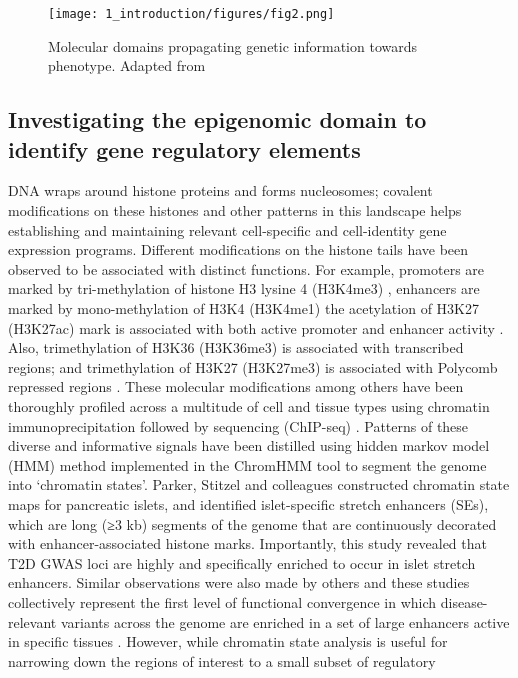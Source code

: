 \begin{figure}
        \centering
        \texttt{[image: 1\_introduction/figures/fig2.png]}
        \caption{Molecular domains propagating genetic information towards phenotype. Adapted from \cite{civelekSystemsGeneticsApproaches2014}}
        \label{fig:ci_f2}
\end{figure}


\subsection{Investigating the epigenomic domain to identify gene regulatory elements}
DNA wraps around histone proteins and forms nucleosomes; covalent modifications on these histones and other patterns in this landscape helps establishing and maintaining relevant cell-specific and cell-identity gene expression programs. Different modifications on the histone tails have been observed to be associated with distinct functions. For example, promoters are marked by tri-methylation of histone H3 lysine 4 (H3K4me3) \cite{bernsteinBivalentChromatinStructure2006, mikkelsenGenomewideMapsChromatin2007,adliGenomewideChromatinMaps2010}, enhancers are marked by mono-methylation of H3K4 (H3K4me1) \cite{heintzmanDistinctPredictiveChromatin2007} the acetylation of H3K27 (H3K27ac) mark is associated with both active promoter and enhancer activity \cite{mikkelsenGenomewideMapsChromatin2007}. Also, trimethylation of H3K36 (H3K36me3) is associated with transcribed regions; and trimethylation of H3K27 (H3K27me3) is associated with Polycomb repressed regions \cite{heintzmanDistinctPredictiveChromatin2007, zhouChartingHistoneModifications2011}. These molecular modifications among others have been thoroughly profiled across a multitude of cell and tissue types using chromatin immunoprecipitation followed by sequencing (ChIP-seq) \cite{theencodeprojectconsortiumIntegratedEncyclopediaDNA2012, consortiumIntegrativeAnalysis1112015}. Patterns of these diverse and informative signals have been distilled using hidden markov model (HMM) method implemented in the ChromHMM tool \cite{ernstMappingAnalysisChromatin2011, ernstChromHMMAutomatingChromatin2012} to segment the genome into ‘chromatin states’. Parker, Stitzel and colleagues constructed chromatin state maps for pancreatic islets, and identified islet-specific stretch enhancers (SEs), which are long (≥3 kb) segments of the genome that are continuously decorated with enhancer-associated histone marks. Importantly, this study revealed that T2D GWAS loci are highly and specifically enriched to occur in islet stretch enhancers. Similar observations were also made by others and these studies collectively represent the first level of functional convergence in which disease-relevant variants across the genome are enriched in a set of large enhancers active in specific tissues \cite{theencodeprojectconsortiumIntegratedEncyclopediaDNA2012,mauranoSystematicLocalizationCommon2012,trynkaChromatinMarksIdentify2013,parkerChromatinStretchEnhancer2013,pasqualiPancreaticIsletEnhancer2014, quangMotifSignaturesStretch2015}. However, while chromatin state analysis is useful for narrowing down the regions of interest to a small subset of regulatory 